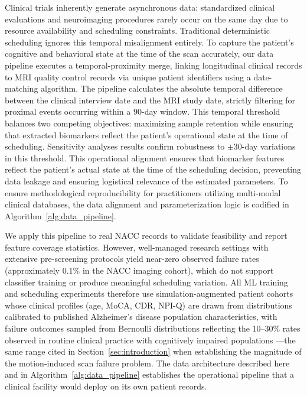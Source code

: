 \documentclass[11pt,a4paper]{article}
\begin{document}
Clinical trials inherently generate asynchronous data: standardized clinical evaluations and neuroimaging procedures rarely occur on the same day due to resource availability and scheduling constraints. Traditional deterministic scheduling ignores this temporal misalignment entirely. To capture the patient's cognitive and behavioral state at the time of the scan accurately, our data pipeline executes a temporal-proximity merge, linking longitudinal clinical records to MRI quality control records via unique patient identifiers using a date-matching algorithm. The pipeline calculates the absolute temporal difference between the clinical interview date and the MRI study date, strictly filtering for proximal events occurring within a 90-day window. This temporal threshold balances two competing objectives: maximizing sample retention while ensuring that extracted biomarkers reflect the patient's operational state at the time of scheduling. Sensitivity analyses results confirm robustness to $\pm$30-day variations in this threshold. This operational alignment ensures that biomarker features reflect the patient's actual state at the time of the scheduling decision, preventing data leakage and ensuring logistical relevance of the estimated parameters. To ensure methodological reproducibility for practitioners utilizing multi-modal clinical databases, the data alignment and parameterization logic is codified in Algorithm~\ref{alg:data_pipeline}.

We apply this pipeline to real NACC records to validate feasibility and report feature coverage statistics. However, well-managed research settings with extensive pre-screening protocols yield near-zero observed failure rates (approximately 0.1\% in the NACC imaging cohort), which do not support classifier training or produce meaningful scheduling variation. All ML training and scheduling experiments therefore use simulation-augmented patient cohorts whose clinical profiles (age, MoCA, CDR, NPI-Q) are drawn from distributions calibrated to published Alzheimer's disease population characteristics, with failure outcomes sampled from Bernoulli distributions reflecting the 10--30\% rates observed in routine clinical practice with cognitively impaired populations \citep{porembka2025disparities}---the same range cited in Section~\ref{sec:introduction} when establishing the magnitude of the motion-induced scan failure problem. The data architecture described here and in Algorithm~\ref{alg:data_pipeline} establishes the operational pipeline that a clinical facility would deploy on its own patient records.
\end{document}
